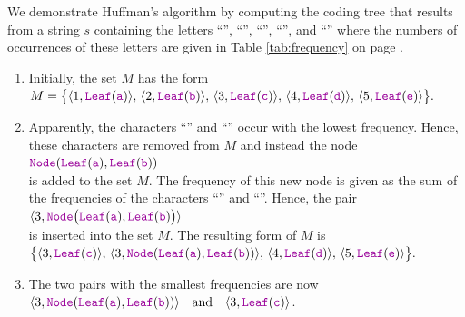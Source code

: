 We demonstrate Huffman's algorithm by computing  the coding tree that results from a string $s$ containing the
letters ``'', ``'', ``'', ``'', and ``'' where the numbers of
occurrences of these letters are given in Table \ref{tab:frequency} on page \pageref{tab:frequency}.
\begin{enumerate}
\item Initially, the set $M$ has the form
      \\[0.2cm]
      \hspace*{0.3cm}
      $ M = \bigl\{ \langle 1, \mytt{Leaf}(\mytt{a}) \rangle,\,
             \langle 2, \mytt{Leaf}(\mytt{b}) \rangle,\, 
             \langle 3, \mytt{Leaf}(\mytt{c}) \rangle,\,
             \langle 4, \mytt{Leaf}(\mytt{d}) \rangle,\,
             \langle 5, \mytt{Leaf}(\mytt{e}) \rangle\bigr\}. $
\item Apparently, the characters ``'' and ``'' occur with the lowest frequency.  Hence,
  these characters are removed from $M$ and instead the node 
      \\[0.2cm]
      \hspace*{0.3cm}
      $\mytt{Node}(\mytt{Leaf}(\mytt{a}), \mytt{Leaf}(\mytt{b}))$
      \\[0.2cm]
      is added to the set $M$.  The frequency of this new node is given as the sum of the frequencies of the
      characters ``'' and ``''.   Hence, the pair 
      \\[0.2cm]
      \hspace*{0.3cm}
      $\langle 3, \mytt{Node}\bigl(\mytt{Leaf}(\mytt{a}), \mytt{Leaf}(\mytt{b}) \bigr) \rangle$
      \\[0.2cm]
      is inserted into the set  $M$.  The resulting form of $M$ is
      \\[0.2cm]
      \hspace*{0.3cm}
      $ \bigl\{\langle 3, \mytt{Leaf}(\mytt{c}) \rangle,\,
			\langle 3, \mytt{Node}(\mytt{Leaf}(\mytt{a}), \mytt{Leaf}(\mytt{b}))\rangle,\,
              \langle 4, \mytt{Leaf}(\mytt{d}) \rangle,\,
             \langle 5, \mytt{Leaf}(\mytt{e}) \rangle\bigr\}. $
\item The two pairs with the smallest frequencies are now
      \\[0.2cm]
      \hspace*{0.3cm}
      $ \langle 3, \mytt{Node}(\mytt{Leaf}(\mytt{a}), \mytt{Leaf}(\mytt{b})) \rangle \quad \mathrm{and} \quad \langle 3, \mytt{Leaf}(\mytt{c})\rangle$.
      \\[0.2cm]

\end{enumerate}
